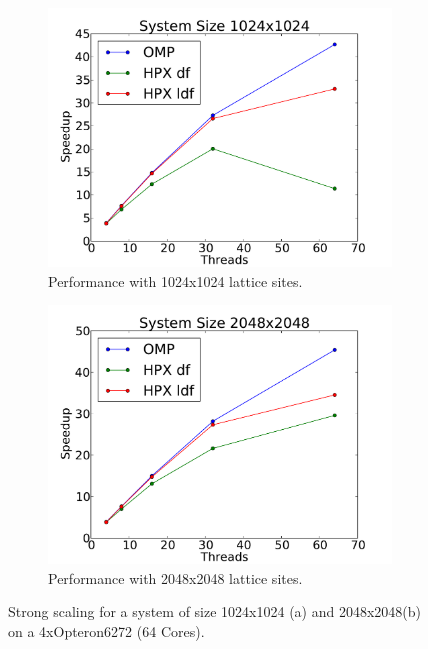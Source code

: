 \documentclass[a4wide,10pt]{scrartcl}
\begin{document}
\begin{figure}
 \begin{subfigure}[b]{0.49\textwidth}
  \centering
  \includegraphics[width=\textwidth]{../plot/trillian_scaling_1024.pdf}\hfill
  \caption{Performance with 1024x1024 lattice sites.} 
  \label{fig:scaling_trillian_1024}
 \end{subfigure}
 \begin{subfigure}[b]{0.49\textwidth}
  \centering
  \includegraphics[width=\textwidth]{../plot/trillian_scaling_2048.pdf}\hfill
  \caption{Performance with 2048x2048 lattice sites.} 
  \label{fig:scaling_trillian_2048}
 \end{subfigure}
 \caption{Strong scaling for a system of size 1024x1024 (a) and 2048x2048(b) on a 4xOpteron6272 (64 Cores).}
\end{figure}
\end{document}
